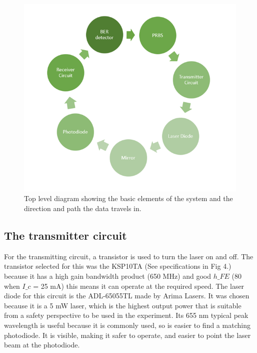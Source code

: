 \documentclass[conference]{IEEEtran}
\begin{document}
\begin{figure}[h]
\includegraphics[width=\linewidth]{fig 3.png}\par
\caption{Top level diagram showing the basic elements of the system and the direction and path the data travels in.}
\label{fig}
\end{figure}

\subsection{The transmitter circuit}

For the transmitting circuit, a transistor is used to turn the laser on and off. The transistor selected for this was the KSP10TA (See specifications in Fig 4.) because it has a high gain bandwidth product (650 MHz) and good $h\_{FE}$ (80 when $I\_{c}$ = 25 mA) this means it can operate at the required speed. The laser diode for this circuit is the ADL-65055TL made by Arima Lasers. It was chosen because it is a 5 mW laser, which is the highest output power that is suitable from a safety perspective to be used in the experiment. Its 655 nm typical peak wavelength is useful because it is commonly used, so is easier to find a matching photodiode. It is visible, making it safer to operate, and easier to point the laser beam at the photodiode.
\end{document}
